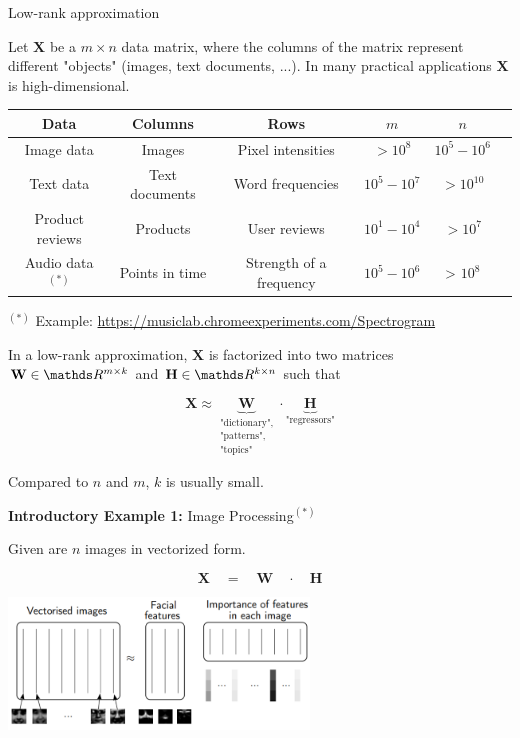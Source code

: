 \documentclass[11pt,compress,t,notes=noshow, xcolor=table]{beamer}
\begin{document}
\begin{vbframe}{Low-rank approximation}

Let $\mathbf{X}$ be a $m \times n$ data matrix, where the columns of the matrix represent different "objects" (images, text documents, ...). In many practical applications $\mathbf{X}$ is high-dimensional.

\begin{footnotesize}
\begin{table}[]
\centering
\begin{tabular}{cccccc}
Data & Columns & Rows & $m$ & $n$\\
\hline
Image data & Images & Pixel intensities & $> 10^{8}$ & $10^5 - 10^6$\\
Text data & Text documents & Word frequencies & $10^5 - 10^7$ & $> 10^{10}$\\
Product reviews & Products & User reviews  & $10^1 - 10^4$ & $> 10^{7}$ \\
Audio data$^{(*)}$ & Points in time & Strength of a frequency & $10^5 - 10^6$ & > $10^{8}$
\end{tabular}
\end{table}
\end{footnotesize}

\vfill
\begin{footnotesize}
$^{(*)}$ Example: \url{https://musiclab.chromeexperiments.com/Spectrogram}
\end{footnotesize}

\framebreak

In a low-rank approximation, $\mathbf{X}$ is factorized into two matrices $\mathbf{W} \in \R^{m \times k}$ and $\mathbf{H} \in \R^{k \times n}$ such that

$$
\mathbf{X} \approx \underbrace{\mathbf{W}}_{\substack{\text{"dictionary",}\\ \text{"patterns",} \\ \text{"topics"}}} \cdot \underbrace{\mathbf{H}}_{\text{"regressors"}}
$$

Compared to $n$ and $m$, $k$ is usually small.

\framebreak

\textbf{Introductory Example 1:} Image Processing$^{(*)}$

\lz

Given are $n$ images in vectorized form.

$$
\bm{X} \quad = \quad \bm{W} \quad \cdot \quad \bm{H}
$$
\begin{center}
\includegraphics[width=0.6\textwidth]{figure_man/ignore/pixel.png}
\end{center}


\end{vbframe}
\end{document}
